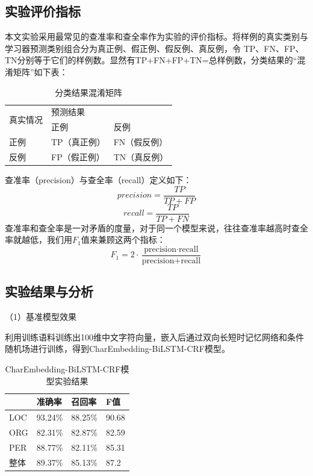 \documentclass[winfonts,master,oneside,nobackinfo]{njuthesis}
\begin{document}
\subsection{实验评价指标}

本文实验采用最常见的查准率和查全率作为实验的评价指标。将样例的真实类别与学习器预测类别组合分为真正例、假正例、假反例、真反例，令
TP、FN、FP、TN分别等于它们的样例数。显然有TP+FN+FP+TN=总样例数，分类结果的“混淆矩阵”如下表：

\begin{table}[H]
\centering
\begin{tabular}{|l|l|l|}
\hline
\multirow{2}{*}{真实情况} & \multicolumn{2}{l|}{预测结果} \\ \cline{2-3} 
                      & 正例          & 反例          \\ \hline
正例                    & TP（真正例）     & FN（假反例）     \\ \hline
反例                    & FP（假正例）     & TN（真反例）     \\ \hline
\end{tabular}
\caption{分类结果混淆矩阵}
\end{table}


查准率（precision）与查全率（recall）定义如下：
\begin{equation}
precision =\frac{T P}{T P+F P}
\end{equation}
\begin{equation}
recall=\frac{T P}{T P+F N}
\end{equation}
查准率和查全率是一对矛盾的度量，对于同一个模型来说，往往查准率越高时查全率就越低，我们用$F_{1}$值来兼顾这两个指标：
\begin{equation}
F_{1}=2 \cdot \frac{\text {precision} \cdot \text {recall}}{\text {precision}+\text {recall}}
\end{equation}
\subsection{实验结果与分析}

（1）基准模型效果

利用训练语料训练出100维中文字符向量，嵌入后通过双向长短时记忆网络和条件随机场进行训练，得到CharEmbedding-BiLSTM-CRF模型。

\begin{table}[H]
\centering
\begin{tabular}{|l|l|l|l|}
\hline
    & 准确率     & 召回率     & F值    \\ \hline
LOC & 93.24\% & 88.25\% & 90.68 \\ \hline
ORG & 82.31\% & 82.87\% & 82.59 \\ \hline
PER & 88.77\% & 82.11\% & 85.31 \\ \hline
整体  & 89.37\% & 85.13\% & 87.2 \\ \hline
\end{tabular}
\caption{CharEmbedding-BiLSTM-CRF模型实验结果}
\end{table}
\end{document}
